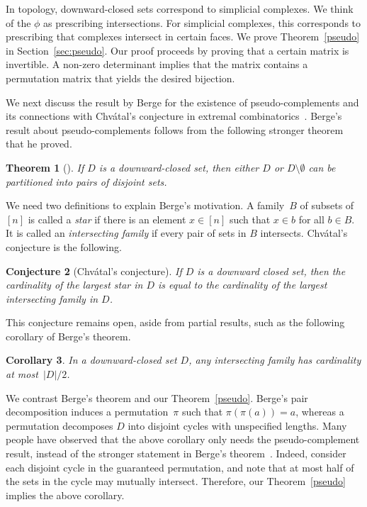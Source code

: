 \documentclass[11pt]{article}
\newtheorem{theorem}{Theorem}[section]
\newtheorem{conjecture}[theorem]{Conjecture}
\newtheorem{corollary}[theorem]{Corollary}
\theoremstyle{definition}
\newcommand{\1}{\mathbf{1}}
\begin{document}
In topology, downward-closed sets correspond to simplicial complexes.  We think of the $\phi$ as prescribing intersections. For simplicial complexes, this corresponds to prescribing that complexes intersect in certain faces.  We prove Theorem~\ref{pseudo} in Section~\ref{sec:pseudo}.  Our proof proceeds by proving that a certain matrix is invertible. A non-zero determinant implies that the matrix contains a permutation matrix that yields the desired bijection.

We next discuss the result by Berge for the existence of pseudo-complements and its connections with Chv\'{a}tal's conjecture in extremal combinatorics~\cite{chvatal}.
Berge's result about pseudo-complements follows from the following stronger theorem that he proved.
\begin{theorem}[\cite{berge}]\label{berge}  If $D$ is a downward-closed set, then either $D$ or $D \setminus \emptyset$ can be partitioned into pairs of disjoint sets.  
\end{theorem}
\noindent
We need two definitions to explain Berge's motivation.   A family~$B$ of subsets of $[n]$ is called a {\em star} if there is an element $x\in [n]$ such that $x \in b$ for all $b \in B$.  It is called an {\em intersecting family} if every pair of sets in $B$ intersects.  Chv\'{a}tal's  conjecture is the following.
\begin{conjecture}[Chv\'{a}tal's conjecture]  If $D$ is a downward closed set, then the cardinality of the largest  star in $D$ is equal to the cardinality of the largest intersecting family in $D$.
\end{conjecture}
\noindent
This conjecture remains open, aside from partial results, such as the following corollary of Berge's theorem.  
\begin{corollary} 
In a downward-closed set $D$, any intersecting family has cardinality at most~$|D|/2$.
\end{corollary}

We contrast Berge's theorem and our Theorem~\ref{pseudo}.  Berge's pair decomposition induces a permutation~$\pi$ such that $\pi(\pi(a)) = a$, whereas a permutation decomposes $D$ into disjoint cycles with unspecified lengths.  Many people have observed that the above corollary only needs the pseudo-complement result, instead of the stronger statement in Berge's theorem~\cite{anderson}.  Indeed, consider each disjoint cycle in the guaranteed permutation, and note that at most half of the sets in the cycle may mutually intersect.   Therefore, our Theorem~\ref{pseudo} implies the above corollary. 
\end{document}
